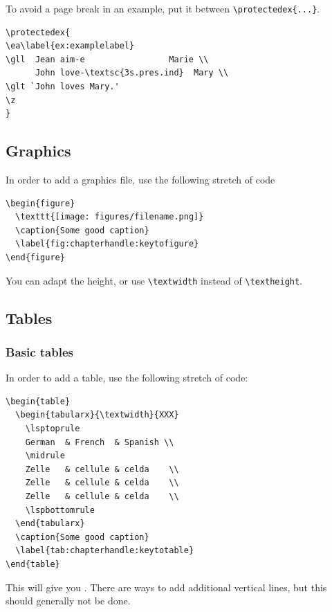 To avoid a page break in an example, put it between \verb+\protectedex{...}+.

\begin{verbatim}
\protectedex{
\ea\label{ex:examplelabel}
\gll  Jean aim-e                 Marie \\
      John love-\textsc{3s.pres.ind}  Mary \\
\glt `John loves Mary.'
\z
}
\end{verbatim}

\subsection{Graphics}
In order to add a graphics file, use the following stretch of code

\begin{verbatim}
\begin{figure}
  \texttt{[image: figures/filename.png]}
  \caption{Some good caption}
  \label{fig:chapterhandle:keytofigure}
\end{figure}
\end{verbatim}

You can adapt the height, or use \verb+\textwidth+ instead of \verb+\textheight+.

\subsection{Tables}
\subsubsection{Basic tables}
In order to add a table, use the following stretch of code:

\begin{verbatim}
\begin{table}
  \begin{tabularx}{\textwidth}{XXX}
    \lsptoprule
    German  & French  & Spanish \\
    \midrule
    Zelle   & cellule & celda    \\
    Zelle   & cellule & celda    \\
    Zelle   & cellule & celda    \\
    \lspbottomrule
  \end{tabularx}
  \caption{Some good caption}
  \label{tab:chapterhandle:keytotable}
\end{table}
\end{verbatim}

This will give you  . There are ways to add additional vertical lines, but this should generally not be done.

